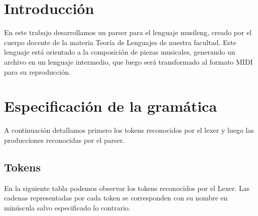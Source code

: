 \documentclass[a4paper,8pt]{article}
\begin{document}
\pagestyle{myheadings}
\maketitle
\thispagestyle{empty}
\tableofcontents


\newpage

\section{Introducción}
En este trabajo desarrollamos un parser para el lenguaje musileng, creado por el cuerpo docente de la materia Teoría de Lenguajes de nuestra facultad. Este lenguaje está orientado a la composición de piezas musicales, generando un archivo en un lenguaje intermedio, que luego será transformado al formato MIDI para su reproducción.


\section{Especificación de la gramática}
A continuación detallamos primero los tokens reconocidos por el lexer y luego las producciones reconocidas por el parser.
\subsection{Tokens}
En la siguiente tabla podemos observar los tokens reconocidos por el Lexer. Las cadenas representadas por cada token se corresponden con su nombre en minúscula salvo especificado lo contrario.
\end{document}
